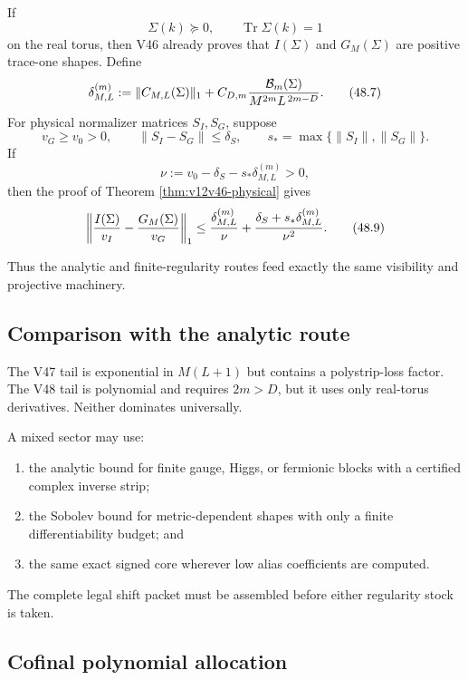 \documentclass[11pt]{article}
\theoremstyle{remark}
\begin{document}
If
\[
 \Sigma(k)\succeq0,\qquad\operatorname{Tr}\Sigma(k)=1
\]
on the real torus, then V46 already proves that \(I(\Sigma)\) and
\(G_M(\Sigma)\) are positive trace-one shapes.  Define
\begin{equation}
 \delta_{M,L}^{(m)}
 :=
 \|C_{M,L}(\Sigma)\|_1
 +
 C_{D,m}
 {{\cal B}_m(\Sigma)\over
  M^{2m}L^{\,2m-D}}.                              \tag{48.7}
\end{equation}
For physical normalizer matrices \(S_I,S_G\), suppose
\[
 v_G\geq v_0>0,\qquad
 \|S_I-S_G\|\leq\delta_S,\qquad
 s_*=\max\{\|S_I\|,\|S_G\|\}.
\]
If
\begin{equation}
 \nu:=v_0-\delta_S-s_*\delta_{M,L}^{(m)}>0,        \tag{48.8}
\end{equation}
then the proof of Theorem \ref{thm:v12v46-physical} gives
\begin{equation}
 \left\|
 {I(\Sigma)\over v_I}
 -
 {G_M(\Sigma)\over v_G}
 \right\|_1
 \leq
 {\delta_{M,L}^{(m)}\over\nu}
 +
 {\delta_S+s_*\delta_{M,L}^{(m)}\over\nu^2}.      \tag{48.9}
\end{equation}

Thus the analytic and finite-regularity routes feed exactly the same
visibility and projective machinery.

\subsection{Comparison with the analytic route}

The V47 tail is exponential in \(M(L+1)\) but contains a
polystrip-loss factor.  The V48 tail is polynomial and requires
\(2m>D\), but it uses only real-torus derivatives.  Neither dominates
universally.

A mixed sector may use:
\begin{enumerate}
\item the analytic bound for finite gauge, Higgs, or fermionic blocks
with a certified complex inverse strip;
\item the Sobolev bound for metric-dependent shapes with only a
finite differentiability budget; and
\item the same exact signed core wherever low alias coefficients are
computed.
\end{enumerate}
The complete legal shift packet must be assembled before either
regularity stock is taken.

\subsection{Cofinal polynomial allocation}
\end{document}

